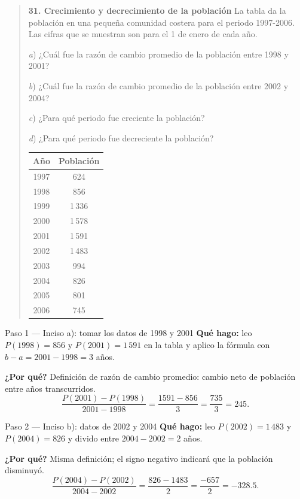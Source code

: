 \documentclass[11pt]{article}
\begin{document}
\begin{quote}
\textbf{31. Crecimiento y decrecimiento de la población} \; La tabla da la población en una pequeña comunidad costera para el periodo 1997-2006. Las cifras que se muestran son para el 1 de enero de cada año.

\emph{a}) ¿Cuál fue la razón de cambio promedio de la población entre 1998 y 2001?

\emph{b}) ¿Cuál fue la razón de cambio promedio de la población entre 2002 y 2004?

\emph{c}) ¿Para qué periodo fue creciente la población?

\emph{d}) ¿Para qué periodo fue decreciente la población?

\begin{center}
\begin{tabular}{|c|c|}
\hline
\textbf{Año} & \textbf{Población}\\
\hline
1997 & 624\\
1998 & 856\\
1999 & 1\,336\\
2000 & 1\,578\\
2001 & 1\,591\\
2002 & 1\,483\\
2003 & 994\\
2004 & 826\\
2005 & 801\\
2006 & 745\\
\hline
\end{tabular}
\end{center}
\end{quote}

\begin{paso}{Paso 1 --- Inciso a): tomar los datos de 1998 y 2001}
\textbf{Qué hago:} leo $P(1998)=856$ y $P(2001)=1\,591$ en la tabla y aplico la fórmula con $b-a=2001-1998=3$ años.

\textbf{¿Por qué?} Definición de razón de cambio promedio: cambio neto de población entre años transcurridos.
\[
\frac{P(2001)-P(1998)}{2001-1998}=\frac{1591-856}{3}=\frac{735}{3}=245.
\]
\end{paso}

\begin{paso}{Paso 2 --- Inciso b): datos de 2002 y 2004}
\textbf{Qué hago:} leo $P(2002)=1\,483$ y $P(2004)=826$ y divido entre $2004-2002=2$ años.

\textbf{¿Por qué?} Misma definición; el signo negativo indicará que la población disminuyó.
\[
\frac{P(2004)-P(2002)}{2004-2002}=\frac{826-1483}{2}=\frac{-657}{2}=-328.5.
\]
\end{paso}
\end{document}
